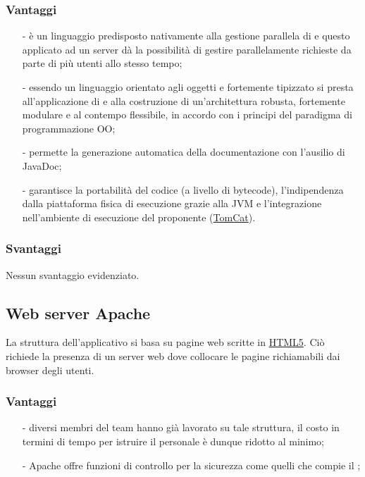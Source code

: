 \subsubsection*{Vantaggi}
\begin{itemize}[noitemsep,nolistsep]
\item[-] è un linguaggio predisposto nativamente alla gestione parallela di  e questo applicato ad un server dà la possibilità di gestire parallelamente richieste da parte di più utenti allo stesso tempo;
\item[-] essendo un linguaggio orientato agli oggetti e fortemente tipizzato si presta all'applicazione di  e alla costruzione di un'architettura robusta, fortemente modulare e al contempo flessibile, in accordo con i principi del paradigma di programmazione OO;
\item[-] permette la generazione automatica della documentazione con l'ausilio di JavaDoc;
\item[-] garantisce la portabilità del codice (a livello di bytecode), l'indipendenza dalla piattaforma fisica di esecuzione grazie alla JVM e l'integrazione nell'ambiente di esecuzione del proponente (\underline{TomCat}).
\end{itemize}

\subsubsection*{Svantaggi}
Nessun svantaggio evidenziato.

 
\subsection{Web server Apache}

La struttura dell'applicativo si basa su pagine web scritte in \underline{HTML5}. Ciò richiede la presenza di un server web dove collocare le pagine richiamabili dai browser degli utenti.

\subsubsection*{Vantaggi}

\begin{itemize}[noitemsep,nolistsep]
  \item[-] diversi membri del team hanno già lavorato su tale struttura, il costo in termini di tempo per istruire il personale è dunque ridotto al minimo;
  \item[-] Apache offre funzioni di controllo per la sicurezza come quelli che compie il ;
\end{itemize}

